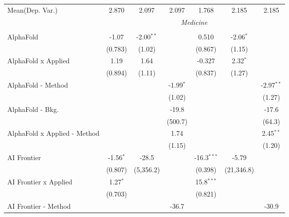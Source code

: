 \begin{tabular}{lcccccc}
Mean(Dep. Var.) & 2.870 & 2.097 & 2.097 & 1.768 & 2.185 & 2.185 \\
 & \multicolumn{6}{c}{\textit{Medicine}} \\ \\
   AlphaFold                    & -1.07          & -2.00$^{**}$ &             & 0.510          & -2.06$^{*}$ &   \\   
                                & (0.783)        & (1.02)       &             & (0.867)        & (1.15)      &   \\   
   AlphaFold x Applied          & 1.19           & 1.64         &             & -0.327         & 2.32$^{*}$  &   \\   
                                & (0.894)        & (1.11)       &             & (0.837)        & (1.27)      &   \\   
   AlphaFold - Method           &                &              & -1.99$^{*}$ &                &             & -2.97$^{**}$\\   
                                &                &              & (1.02)      &                &             & (1.27)\\   
   AlphaFold - Bkg.             &                &              & -19.8       &                &             & -17.6\\   
                                &                &              & (500.7)     &                &             & (64.3)\\   
   AlphaFold x Applied - Method &                &              & 1.74        &                &             & 2.45$^{**}$\\   
                                &                &              & (1.15)      &                &             & (1.20)\\   
   AI Frontier                  & -1.56$^{*}$    & -28.5        &             & -16.3$^{***}$  & -5.79       &   \\   
                                & (0.807)        & (5,356.2)    &             & (0.398)        & (21,346.8)  &   \\   
   AI Frontier x Applied        & 1.27$^{*}$     &              &             & 15.8$^{***}$   &             &   \\   
                                & (0.703)        &              &             & (0.821)        &             &   \\   
   AI Frontier - Method         &                &              & -36.7       &                &             & -30.9\\   

\end{tabular}
